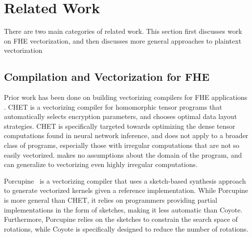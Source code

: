 \section{Related Work}\label{sec:related-work}
There are two main categories of related work. This section first discusses work on FHE vectorization, and then discusses more general approaches to plaintext vectorization 

\subsection{Compilation and Vectorization for FHE}
Prior work has been done on building vectorizing compilers for FHE applications \cite{CHET, Porcupine}.
CHET \cite{CHET} is a vectorizing compiler for homomorphic tensor programs that automatically selects encryption parameters, and chooses optimal data layout strategies.
CHET is specifically targeted towards optimizing the dense tensor computations found in neural network inference, and does not apply to a broader class of programs, especially those with irregular computations that are not so easily vectorized.
\system makes no assumptions about the domain of the program, and can generalize to vectorizing even highly irregular computations.

Porcupine~\cite{Porcupine} is a vectorizing compiler that uses a sketch-based synthesis approach to generate vectorized kernels given a reference implementation. While Porcupine is more general than CHET, it relies on programmers providing partial implementations in the form of sketches, making it less automatic than Coyote. Furthermore, Porcupine relies on the sketches to constrain the search space of rotations, while Coyote is specifically designed to reduce the number of rotations.


